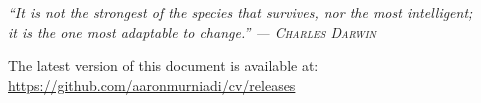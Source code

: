 \documentclass[11pt,a4paper]{article} %
\begin{document}
\vfill

\begin{flushright}
    \textit{
        ``It is not the strongest of the species that survives, nor the most intelligent;\\it is the one most adaptable to change.'' — \textsc{Charles Darwin}}
\end{flushright}

\vfill

\vfill

\begin{center}
    \smaller
    The latest version of this document is available at:\\\href{https://github.com/aaronmurniadi/cv/releases}{https://github.com/aaronmurniadi/cv/releases}
\end{center}
\end{document}
